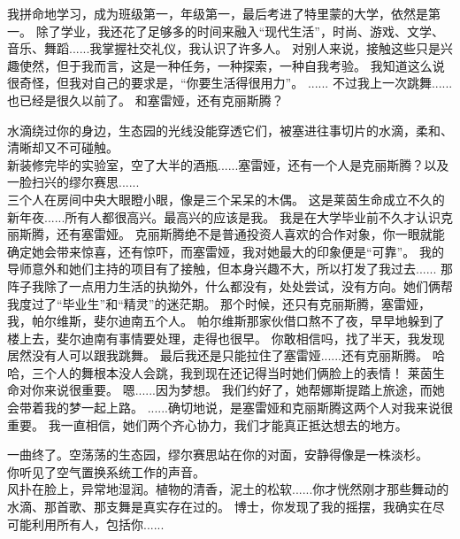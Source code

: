 \documentclass[openany]{book}
\begin{document}
\begin{dialogue}
     我拼命地学习，成为班级第一，年级第一，最后考进了特里蒙的大学，依然是第一。
     除了学业，我还花了足够多的时间来融入“现代生活”，时尚、游戏、文学、音乐、舞蹈......我掌握社交礼仪，我认识了许多人。
     对别人来说，接触这些只是兴趣使然，但于我而言，这是一种任务，一种探索，一种自我考验。
     我知道这么说很奇怪，但我对自己的要求是，“你要生活得很用力”。
     ......
     不过我上一次跳舞......也已经是很久以前了。
     和塞雷娅，还有克丽斯腾？\par
    水滴绕过你的身边，生态园的光线没能穿透它们，被塞进往事切片的水滴，柔和、清晰却又不可碰触。\\
    新装修完毕的实验室，空了大半的酒瓶......塞雷娅，还有一个人是克丽斯腾？以及一脸扫兴的缪尔赛思......\\
    三个人在房间中央大眼瞪小眼，像是三个呆呆的木偶。
     这是莱茵生命成立不久的新年夜......所有人都很高兴。最高兴的应该是我。
     我是在大学毕业前不久才认识克丽斯腾，还有塞雷娅。
     克丽斯腾绝不是普通投资人喜欢的合作对象，你一眼就能确定她会带来惊喜，还有惊吓，而塞雷娅，我对她最大的印象便是“可靠”。
     我的导师意外和她们主持的项目有了接触，但本身兴趣不大，所以打发了我过去......
     那阵子我除了一点用力生活的执拗外，什么都没有，处处尝试，没有方向。她们俩帮我度过了“毕业生”和“精灵”的迷茫期。
     那个时候，还只有克丽斯腾，塞雷娅，我，帕尔维斯，斐尔迪南五个人。
     帕尔维斯那家伙借口熬不了夜，早早地躲到了楼上去，斐尔迪南有事情要处理，走得也很早。
     你敢相信吗，找了半天，我发现居然没有人可以跟我跳舞。
     最后我还是只能拉住了塞雷娅......还有克丽斯腾。
     哈哈，三个人的舞根本没人会跳，我到现在还记得当时她们俩脸上的表情！
     莱茵生命对你来说很重要。
     嗯......因为梦想。
     我们约好了，她帮娜斯提踏上旅途，而她会带着我的梦一起上路。
     ......确切地说，是塞雷娅和克丽斯腾这两个人对我来说很重要。
     我一直相信，她们两个齐心协力，我们才能真正抵达想去的地方。\par
    一曲终了。空荡荡的生态园，缪尔赛思站在你的对面，安静得像是一株淡杉。\\
    你听见了空气置换系统工作的声音。\\
    风扑在脸上，异常地湿润。植物的清香，泥土的松软......你才恍然刚才那些舞动的水滴、那首歌、那支舞是真实存在过的。
     博士，你发现了我的摇摆，我确实在尽可能利用所有人，包括你......

\end{dialogue}
\end{document}
